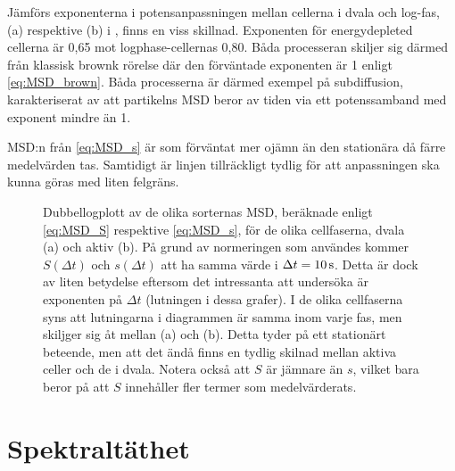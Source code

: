 Jämförs exponenterna i potensanpassningen mellan cellerna i dvala och log-fas, (a) respektive (b) i , finns en viss skillnad. Exponenten för energydepleted cellerna är  0,65 mot logphase-cellernas 0,80. Båda processeran skiljer sig därmed från klassisk brownk rörelse där den förväntade exponenten är 1 enligt \eqref{eq:MSD_brown}. Båda processerna är därmed exempel på subdiffusion, karakteriserat av att partikelns MSD beror av tiden via ett potenssamband med exponent mindre än 1.



MSD:n från \eqref{eq:MSD_s} är som förväntat mer ojämn än den stationära då färre medelvärden tas. Samtidigt är linjen tillräckligt tydlig för att anpassningen ska kunna göras med liten felgräns.

\begin{figure}\centerline{
\subfigure[][]{

}
\subfigure[][]{

}}
\caption{Dubbellogplott av de olika sorternas MSD, beräknade enligt \eqref{eq:MSD_S} respektive \eqref{eq:MSD_s}, för de olika cellfaserna, dvala (a) och aktiv (b). På grund av normeringen som användes kommer $S(\Delta{t})$ och  $s(\Delta{t})$ att ha samma värde i $\Delta{t}=\unit[10]{s}$. Detta är dock av liten betydelse eftersom det intressanta att undersöka är exponenten på $\Delta{t}$ (lutningen i dessa grafer). I de olika cellfaserna syns att lutningarna i diagrammen är samma inom varje fas, men skiljger sig åt mellan (a) och (b). Detta tyder på ett stationärt beteende, men att det ändå finns en tydlig skilnad mellan aktiva celler och de i dvala. Notera också att $S$ är jämnare än $s$, vilket bara beror på att $S$ innehåller fler termer som medelvärderats. }
\label{fig:MSD}
\end{figure}



\section{Spektraltäthet}






